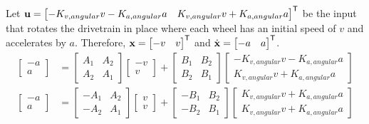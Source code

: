 Let $\mathbf{u} =
\begin{bmatrix}
  -K_{v,angular} v - K_{a,angular} a & K_{v,angular} v + K_{a,angular} a
\end{bmatrix}^\mathsf{T}$ be the input that rotates the drivetrain in place where each
wheel has an initial speed of $v$ and accelerates by $a$. Therefore, $\mathbf{x} =
\begin{bmatrix}
  -v & v
\end{bmatrix}^\mathsf{T}$ and $\dot{\mathbf{x}} =
\begin{bmatrix}
  -a & a
\end{bmatrix}^\mathsf{T}$.
\begin{align*}
  \begin{bmatrix}
    -a \\
    a
  \end{bmatrix} &=
    \begin{bmatrix}
      A_1 & A_2 \\
      A_2 & A_1
    \end{bmatrix}
    \begin{bmatrix}
      -v \\
      v
    \end{bmatrix} +
    \begin{bmatrix}
      B_1 & B_2 \\
      B_2 & B_1
    \end{bmatrix}
    \begin{bmatrix}
      -K_{v,angular} v - K_{a,angular} a \\
      K_{v,angular} v + K_{a,angular} a
    \end{bmatrix} \\
  \begin{bmatrix}
    -a \\
    a
  \end{bmatrix} &=
    \begin{bmatrix}
      -A_1 & A_2 \\
      -A_2 & A_1
    \end{bmatrix}
    \begin{bmatrix}
      v \\
      v
    \end{bmatrix} +
    \begin{bmatrix}
      -B_1 & B_2 \\
      -B_2 & B_1
    \end{bmatrix}
    \begin{bmatrix}
      K_{v,angular} v + K_{a,angular} a \\
      K_{v,angular} v + K_{a,angular} a

\end{bmatrix}
\end{align*}
